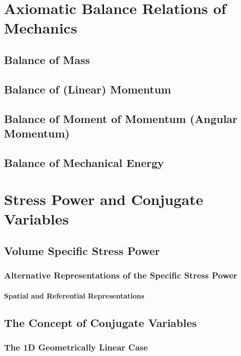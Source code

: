 \documentclass[a5paper,twosided,11pt,DIV=15,BCOR=0mm]{scrbook}
\begin{document}
\chapter{Axiomatic Balance Relations of Mechanics}

\section{Balance of Mass}

\section{Balance of (Linear) Momentum}

\section{Balance of Moment of Momentum (Angular Momentum)}

\section{Balance of Mechanical Energy}

\chapter{Stress Power and Conjugate Variables}

\section{Volume Specific Stress Power}

\subsection{Alternative Representations of the Specific Stress Power}
\subsubsection{Spatial and Referential Representations}

\section{The Concept of Conjugate Variables}
\subsection{The 1D Geometrically Linear Case}
\end{document}
